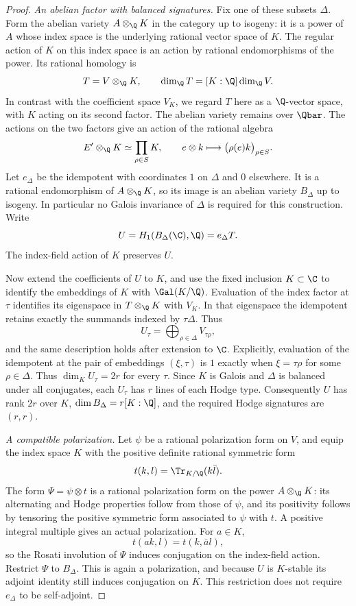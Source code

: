 \begin{proof}
\medskip\noindent
\emph{An abelian factor with balanced signatures.}
Fix one of these subsets $\Delta$.  Form the abelian variety
$A\otimes_{\Q}K$ in the category up to isogeny: it is a power of $A$
whose index space is the underlying rational vector space of $K$.
The regular action of $K$ on this index space is an action by rational
endomorphisms of the power.  Its rational homology is
\[
 T=V\otimes_{\Q}K,\qquad
 \dim_\Q T=[K:\Q]\dim_\Q V.
\]
In contrast with the coefficient space $V_K$, we regard $T$ here as a
$\Q$-vector space, with $K$ acting on its second factor.  The abelian
variety remains over $\Qbar$.  The actions on the two factors give
an action of the rational algebra
\[
 E'\otimes_{\Q}K\simeq\prod_{\rho\in S}K,
 \qquad e\otimes k\longmapsto\bigl(\rho(e)k\bigr)_{\rho\in S}.
\]
Let $e_\Delta$ be the idempotent with coordinates $1$ on $\Delta$ and
$0$ elsewhere.  It is a rational endomorphism of $A\otimes_{\Q}K$,
so its image is an abelian variety $B_\Delta$ up to isogeny.  In
particular no Galois invariance of $\Delta$ is required for this
construction.  Write
\[
                   U=H_1(B_\Delta(\C),\Q)=e_\Delta T.
\]
The index-field action of $K$ preserves $U$.

Now extend the coefficients of $U$ to $K$, and use the fixed inclusion
$K\subset\C$ to identify the embeddings of $K$ with $\Gal(K/\Q)$.
Evaluation of the index factor at $\tau$ identifies its eigenspace in
$T\otimes_\Q K$ with $V_K$.  In that eigenspace the idempotent retains
exactly the summands indexed by $\tau\Delta$.  Thus
\begin{equation}
\label{eq:cm-embedding-summand}
                  U_\tau=\bigoplus_{\rho\in\Delta}V_{\tau\rho},
\end{equation}
and the same description holds after extension to $\C$.  Explicitly,
evaluation of the idempotent at the pair of embeddings $(\xi,\tau)$ is $1$ exactly
when $\xi=\tau\rho$ for some $\rho\in\Delta$.  Thus
$\dim_K U_\tau=2r$ for every $\tau$.  Since $K$ is Galois and
$\Delta$ is balanced under all conjugates, each $U_\tau$ has $r$ lines
of each Hodge type.  Consequently $U$ has rank $2r$ over $K$,
$\dim B_\Delta=r[K:\Q]$, and the required Hodge signatures are
$(r,r)$.

\medskip\noindent
\emph{A compatible polarization.}
Let $\psi$ be a
rational polarization form on $V$, and equip the index space $K$ with
the positive definite rational symmetric form
\[
                       t(k,l)=\Tr_{K/\Q}(k\bar l).
\]
The form $\Psi=\psi\otimes t$ is a rational polarization form on the
power $A\otimes_{\Q}K$: its alternating and Hodge properties follow
from those of $\psi$, and its positivity follows by tensoring the
positive symmetric form associated to $\psi$ with $t$.  A positive
integral multiple gives an actual polarization.  For $a\in K$,
\[
                       t(ak,l)=t(k,\bar a l),
\]
so the Rosati involution of $\Psi$ induces conjugation on the
index-field action.  Restrict $\Psi$ to $B_\Delta$.  This is again a
polarization, and because $U$ is $K$-stable its adjoint identity still
induces conjugation on $K$.  This restriction does not require
$e_\Delta$ to be self-adjoint.


\end{proof}

